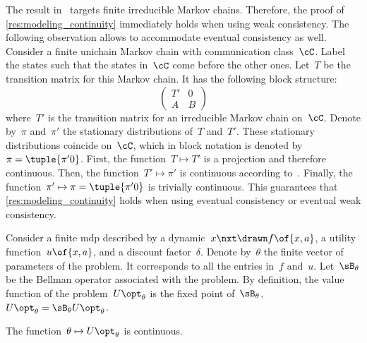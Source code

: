 The result in~\cite[Theorem~4.1]{meyer:1980} targets finite irreducible Markov chains.
Therefore, the proof of \cref{res:modeling_continuity} immediately holds when using weak consistency.
The following observation allows to accommodate eventual consistency as well.
Consider a finite unichain Markov chain with communication class~\(\cC\).
Label the states such that the states in~\(\cC\) come before the other ones.
Let~\(T\) be the transition matrix for this Markov chain.
It has the following block structure:
\[
\begin{pmatrix}
  T' & 0 \\
  A  & B
\end{pmatrix}
\]
where~\(T'\) is the transition matrix for an irreducible Markov chain on~\(\cC\).
Denote by~\(\pi\) and~\(\pi'\) the stationary distributions of~\(T\) and~\(T'\).
These stationary distributions coincide on~\(\cC\), which in block notation is denoted by~\(\pi = \tuple{\pi' 0}\).
First, the function~\(T \mapsto T'\) is a projection and therefore continuous.
Then, the function~\(T' \mapsto \pi'\) is continuous according to~\cite[Theorem~4.1]{meyer:1980}.
Finally, the function~\(\pi' \mapsto \pi = \tuple{\pi' 0}\) is trivially continuous.
This guarantees that \cref{res:modeling_continuity} holds when using eventual consistency or eventual weak consistency.

\begin{lemma}
\label{res:markov_continuity}
Consider a finite \ac{mdp} described by a dynamic~\(x\nxt \drawn f \of{x, a}\), a utility function~\(u \of{x, a}\), and a discount factor~\(\delta\).
Denote by~\(\theta\) the finite vector of parameters of the problem.
It corresponds to all the entries in~\(f\) and~\(u\).
Let~\(\Btheta\) be the Bellman operator associated with the problem.
By definition, the value function of the problem~\(\Utheta\) is the fixed point of~\(\Btheta\), \(\Utheta = \Btheta \Utheta\).

The function~\(\theta \mapsto \Utheta\) is continuous.
\end{lemma}


